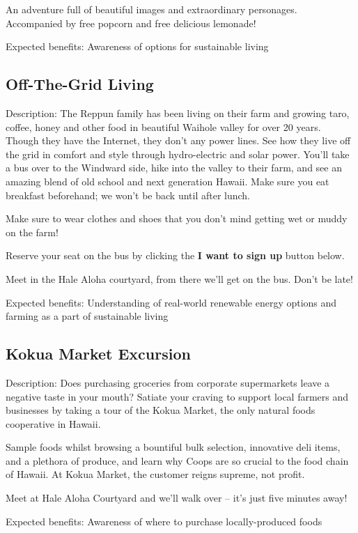 An adventure full of beautiful images and extraordinary personages. Accompanied by free popcorn and free delicious lemonade!

Expected benefits: Awareness of options for sustainable living


\subsection{Off-The-Grid Living}

Description: The Reppun family has been living on their farm and growing taro, coffee, honey and other food in beautiful Waihole valley for over 20 years.  Though they have the Internet, they don't any power lines. See how they live off the grid in comfort and style through hydro-electric and solar power. You'll take a bus over to the Windward side, hike into the valley to their farm, and see an amazing blend of old school and next generation Hawaii. Make sure you eat breakfast beforehand; we won't be back until after lunch.

Make sure to wear clothes and shoes that you don't mind getting wet or muddy on the farm!

Reserve your seat on the bus by clicking the \textbf{I want to sign up} button below. 

Meet in the Hale Aloha courtyard, from there we'll get on the bus.  Don't be late!

Expected benefits: Understanding of real-world renewable energy options and farming as a part of sustainable living


\subsection{Kokua Market Excursion}

Description: Does purchasing groceries from corporate supermarkets leave a negative taste in your mouth? Satiate your craving to support local farmers and businesses by taking a tour of the Kokua Market, the only natural foods cooperative in Hawaii.

Sample foods whilst browsing a bountiful bulk selection, innovative deli items, and a plethora of produce, and learn why Coops are so crucial to the food chain of Hawaii.  At Kokua Market, the customer reigns supreme, not profit.

Meet at Hale Aloha Courtyard and we'll walk over -- it's just five minutes away!

Expected benefits: Awareness of where to purchase locally-produced foods


